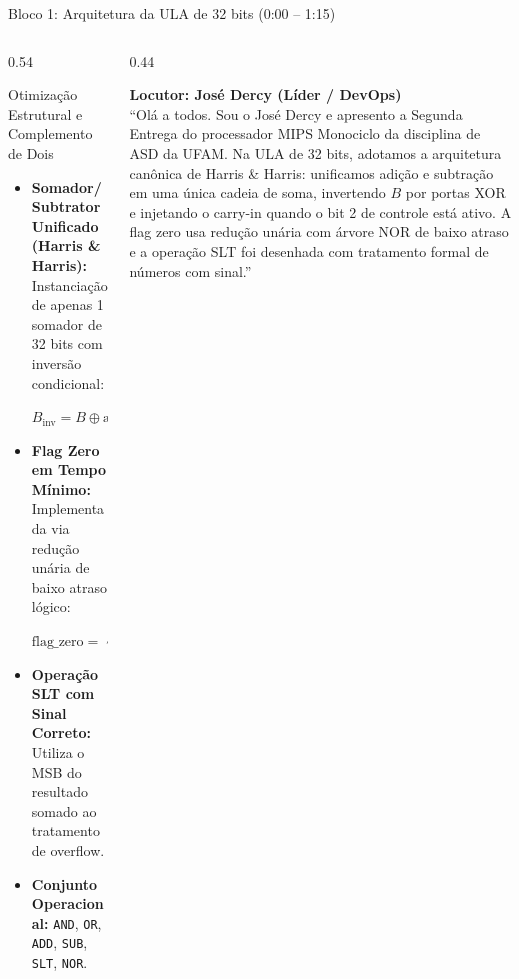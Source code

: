 \documentclass[aspectratio=169, 10pt]{beamer}
\begin{document}
\begin{frame}{Bloco 1: Arquitetura da ULA de 32 bits (0:00 -- 1:15)}
  \begin{columns}[T]
    \begin{column}{0.54\textwidth}
      \begin{block}{Otimização Estrutural e Complemento de Dois}
        \footnotesize
        \begin{itemize}\setlength{\itemsep}{1pt}
          \item \textbf{Somador/Subtrator Unificado (Harris \& Harris):}
            Instanciação de apenas 1 somador de 32 bits com inversão condicional:
            \par\centering $B_{\text{inv}} = B \oplus \text{alu\_control}[2], \quad S = A + B_{\text{inv}} + \text{alu\_control}[2]$\par
          \item \textbf{Flag Zero em Tempo Mínimo:}
            Implementada via redução unária de baixo atraso lógico:
            \par\centering $\text{flag\_zero} = \sim\!(|\,\text{alu\_result})$\par
          \item \textbf{Operação SLT com Sinal Correto:}
            Utiliza o MSB do resultado somado ao tratamento de overflow.
          \item \textbf{Conjunto Operacional:} \texttt{AND}, \texttt{OR}, \texttt{ADD}, \texttt{SUB}, \texttt{SLT}, \texttt{NOR}.
        \end{itemize}
      \end{block}
    \end{column}

    \begin{column}{0.44\textwidth}
      \begin{tcolorbox}[speakerbox]
        \textbf{Locutor: José Dercy (Líder / DevOps)}\\
        \vspace{1mm}
        \scriptsize
        ``Olá a todos. Sou o José Dercy e apresento a Segunda Entrega do processador MIPS Monociclo da disciplina de ASD da UFAM.
        Na ULA de 32 bits, adotamos a arquitetura canônica de Harris \& Harris: unificamos adição e subtração em uma única cadeia de soma, invertendo $B$ por portas XOR e injetando o carry-in quando o bit 2 de controle está ativo.
        A flag zero usa redução unária com árvore NOR de baixo atraso e a operação SLT foi desenhada com tratamento formal de números com sinal.''
      \end{tcolorbox}
    \end{column}
  \end{columns}
\end{frame}
\end{document}
